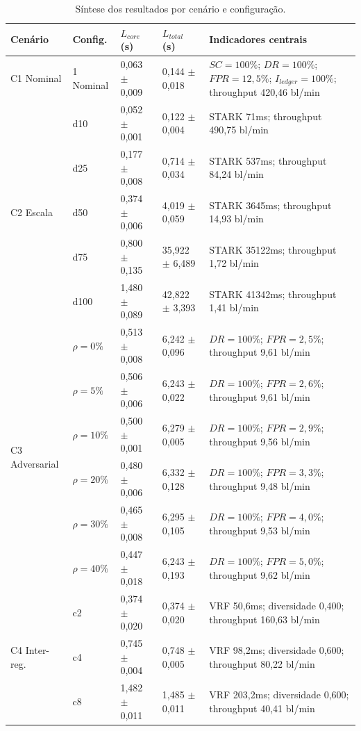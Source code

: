 \documentclass[12pt]{article}
\begin{document}
\begin{table}[htbp]
\centering
\caption{Síntese dos resultados por cenário e configuração.}
\label{tab:resumo-resultados}
\small
\begin{tabular}{p{1.9cm}p{1.5cm}p{2.1cm}p{2.1cm}p{4.3cm}}
\hline
\textbf{Cenário} & \textbf{Config.} & \textbf{$L_{core}$ (s)} & \textbf{$L_{total}$ (s)} & \textbf{Indicadores centrais} \\
\hline
C1 Nominal & 1 Nominal & 0,063 $\pm$ 0,009 & 0,144 $\pm$ 0,018 & $SC=100\%$; $DR=100\%$; $FPR=12,5\%$; $I_{ledger}=100\%$; throughput 420,46 bl/min \\
\hline
\multirow{5}{*}{C2 Escala} & d10 & 0,052 $\pm$ 0,001 & 0,122 $\pm$ 0,004 & STARK 71ms; throughput 490,75 bl/min \\
& d25 & 0,177 $\pm$ 0,008 & 0,714 $\pm$ 0,034 & STARK 537ms; throughput 84,24 bl/min \\
& d50 & 0,374 $\pm$ 0,006 & 4,019 $\pm$ 0,059 & STARK 3645ms; throughput 14,93 bl/min \\
& d75 & 0,800 $\pm$ 0,135 & 35,922 $\pm$ 6,489 & STARK 35122ms; throughput 1,72 bl/min \\
& d100 & 1,480 $\pm$ 0,089 & 42,822 $\pm$ 3,393 & STARK 41342ms; throughput 1,41 bl/min \\
\hline
\multirow{6}{*}{C3 Adversarial} & $\rho=0\%$ & 0,513 $\pm$ 0,008 & 6,242 $\pm$ 0,096 & $DR=100\%$; $FPR=2,5\%$; throughput 9,61 bl/min \\
& $\rho=5\%$ & 0,506 $\pm$ 0,006 & 6,243 $\pm$ 0,022 & $DR=100\%$; $FPR=2,6\%$; throughput 9,61 bl/min \\
& $\rho=10\%$ & 0,500 $\pm$ 0,001 & 6,279 $\pm$ 0,005 & $DR=100\%$; $FPR=2,9\%$; throughput 9,56 bl/min \\
& $\rho=20\%$ & 0,480 $\pm$ 0,006 & 6,332 $\pm$ 0,128 & $DR=100\%$; $FPR=3,3\%$; throughput 9,48 bl/min \\
& $\rho=30\%$ & 0,465 $\pm$ 0,008 & 6,295 $\pm$ 0,105 & $DR=100\%$; $FPR=4,0\%$; throughput 9,53 bl/min \\
& $\rho=40\%$ & 0,447 $\pm$ 0,018 & 6,243 $\pm$ 0,193 & $DR=100\%$; $FPR=5,0\%$; throughput 9,62 bl/min \\
\hline
\multirow{5}{*}{C4 Inter-reg.} & c2 & 0,374 $\pm$ 0,020 & 0,374 $\pm$ 0,020 & VRF 50,6ms; diversidade 0,400; throughput 160,63 bl/min \\
& c4 & 0,745 $\pm$ 0,004 & 0,748 $\pm$ 0,005 & VRF 98,2ms; diversidade 0,600; throughput 80,22 bl/min \\
& c8 & 1,482 $\pm$ 0,011 & 1,485 $\pm$ 0,011 & VRF 203,2ms; diversidade 0,600; throughput 40,41 bl/min \\

\end{tabular}
\end{table}
\end{document}
